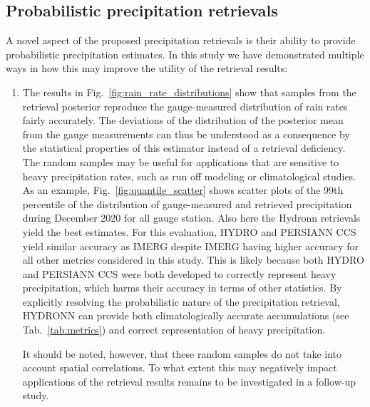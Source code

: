 \documentclass[journal abbreviation, manuscript]{copernicus}
\begin{document}
\subsection{Probabilistic precipitation retrievals}

A novel aspect of the proposed precipitation retrievals is their ability to
provide probabilistic precipitation estimates. In this study we have
demonstrated multiple ways in how this may improve the utility of the retrieval
results:

\begin{enumerate}
  \item The results in Fig.~\ref{fig:rain_rate_distributions} show that samples
    from the retrieval posterior reproduce the gauge-measured distribution of
    rain rates fairly accurately. The deviations of the distribution of the
    posterior mean from the gauge measurements can thus be understood as a
    consequence by the statistical properties of this estimator instead of a
    retrieval deficiency. The random samples may be useful for applications that
    are sensitive to heavy precipitation rates, such as run off modeling or
    climatological studies. As an example, Fig.~\ref{fig:quantile_scatter} shows
    scatter plots of the 99th percentile of the distribution of gauge-measured
    and retrieved precipitation during December 2020 for all gauge station. Also
    here the Hydronn retrievals yield the best estimates. For this evaluation,
    HYDRO and PERSIANN CCS yield similar accuracy as IMERG despite IMERG having
    higher accuracy for all other metrics considered in this study. This is
    likely because both HYDRO and PERSIANN CCS were both developed to correctly
    represent heavy precipitation, which harms their accuracy in terms of other
    statistics. By explicitly resolving the probabilistic nature of the
    precipitation retrieval, HYDRONN can provide both climatologically accurate
    accumulations (see Tab.~\ref{tab:metrics}) and correct representation of
    heavy precipitation.

    It should be noted, however, that these random samples do not take into
    account spatial correlations. To what extent this may negatively impact
    applications of the retrieval results remains to be investigated in a
    follow-up study.


\end{enumerate}
\end{document}
